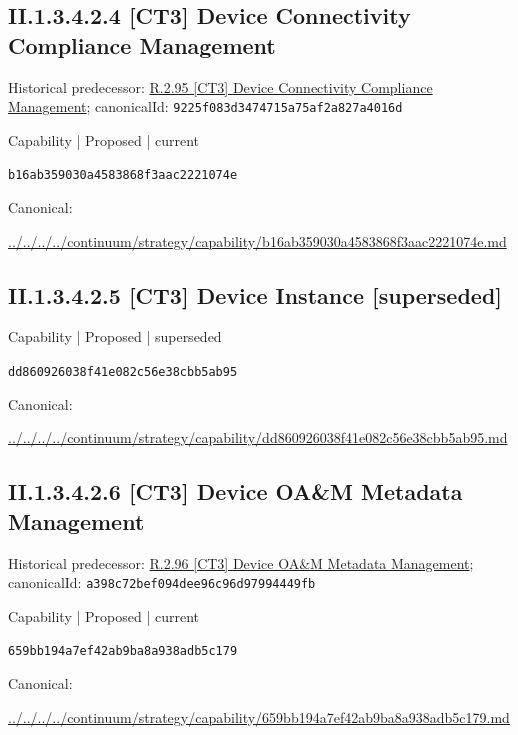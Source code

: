 \documentclass[10pt,a4paper]{article}
\begin{document}
\subsection*{II.1.3.4.2.4 [CT3] Device Connectivity Compliance Management}
Historical predecessor: \hyperref[element-9225f083d3474715a75af2a827a4016d]{R.2.95 [CT3] Device Connectivity Compliance Management}; canonicalId: \texttt{9225f083d3474715a75af2a827a4016d}\par
\label{element-b16ab359030a4583868f3aac2221074e}
{\small Capability | Proposed | current}\par
\texttt{b16ab359030a4583868f3aac2221074e}\par
Canonical: \par
{\footnotesize\url{../../../../continuum/strategy/capability/b16ab359030a4583868f3aac2221074e.md}}\par
\subsection*{II.1.3.4.2.5 [CT3] Device Instance [superseded]}
\label{element-dd860926038f41e082c56e38cbb5ab95}
{\small Capability | Proposed | superseded}\par
\texttt{dd860926038f41e082c56e38cbb5ab95}\par
Canonical: \par
{\footnotesize\url{../../../../continuum/strategy/capability/dd860926038f41e082c56e38cbb5ab95.md}}\par
\subsection*{II.1.3.4.2.6 [CT3] Device OA\&M Metadata Management}
Historical predecessor: \hyperref[element-a398c72bef094dee96c96d97994449fb]{R.2.96 [CT3] Device OA\&M Metadata Management}; canonicalId: \texttt{a398c72bef094dee96c96d97994449fb}\par
\label{element-659bb194a7ef42ab9ba8a938adb5c179}
{\small Capability | Proposed | current}\par
\texttt{659bb194a7ef42ab9ba8a938adb5c179}\par
Canonical: \par
{\footnotesize\url{../../../../continuum/strategy/capability/659bb194a7ef42ab9ba8a938adb5c179.md}}\par
\end{document}
